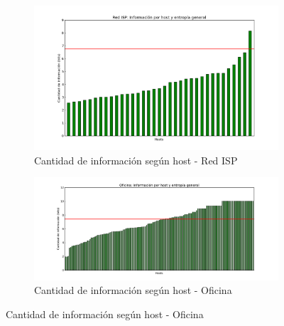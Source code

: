 \begin{figure}[H]
        \begin{subfigure}[H]{0.5\textwidth}
                \centering
                \includegraphics[width=1\textwidth]{graficos/infoHost_casa.png}
                \caption{Cantidad de informaci\'on seg\'un host - Red ISP}
                \label{fig:info1}
        \end{subfigure}
        \begin{subfigure}[H]{0.55\textwidth}
                \centering
                \includegraphics[width=1\textwidth]{graficos/infoHost_oficina.png}
                \caption{Cantidad de informaci\'on seg\'un host - Oficina}
                \label{fig:info2}
        \end{subfigure}
\end{figure}

